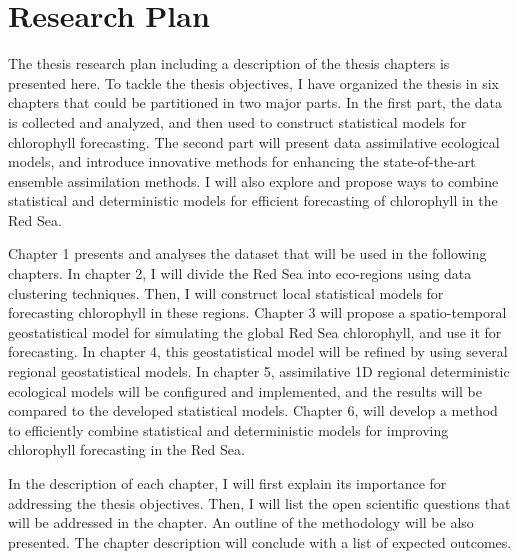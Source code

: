 \chapter{Research Plan}

The thesis research plan including a description of the thesis chapters is
presented here. To tackle the thesis objectives, I have organized the thesis in
six chapters that could be partitioned in two major parts. In the first part,
the data is collected and analyzed, and then used to construct statistical
models for chlorophyll forecasting. The second part will present data
assimilative ecological models, and introduce innovative methods for enhancing
the state-of-the-art ensemble assimilation methods. I will also explore and
propose ways to combine statistical and
deterministic models for efficient forecasting of chlorophyll in the Red Sea.

Chapter 1 presents and analyses the dataset that will be used in the following
chapters.  In chapter 2, I will divide the Red Sea into eco-regions using data
clustering techniques. Then, I will construct local statistical models for
forecasting chlorophyll in these regions. Chapter 3 will propose a
spatio-temporal geostatistical model for simulating the global Red Sea
chlorophyll, and use it for forecasting. In chapter 4, this geostatistical
model will be refined by using several regional geostatistical models. In
chapter 5, assimilative 1D regional deterministic ecological models will be
configured and implemented, and the results will be compared to the developed
statistical models.  Chapter 6, will develop a method to efficiently combine
statistical and deterministic models for improving chlorophyll forecasting in
the Red Sea.

In the description of each chapter, I will first explain its importance for
addressing the thesis objectives. Then, I will list the open scientific questions
that will be addressed in the chapter. An outline of the methodology will be
also presented. The chapter description will conclude with a list of expected
outcomes.
